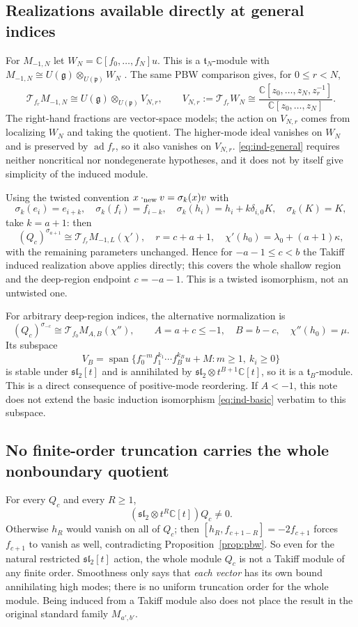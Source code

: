 \documentclass[11pt,a4paper]{article}
\theoremstyle{upright}
\newcommand{\C}{\mathbb C}
\newcommand{\g}{\mathfrak g}
\newcommand{\p}{\mathfrak p}
\newcommand{\slc}{\mathfrak{sl}_2}
\newcommand{\T}{\mathcal T}
\DeclareMathOperator{\ad}{ad}
\DeclareMathOperator{\Span}{span}
\begin{document}
\subsection{Realizations available directly at general indices}
For $M_{-1,N}$ let $W_N=\C[f_0,\ldots,f_N]u$. This is a $\mathfrak t_N$-module
with $M_{-1,N}\cong U(\g)\otimes_{U(\p)}W_N$ \cite[Lemma 2.2]{FGXZ}. The
same PBW comparison gives, for $0\le r<N$,
\begin{equation}\label{eq:ind-general}
\T_{f_r}M_{-1,N}\cong U(\g)\otimes_{U(\p)}V_{N,r},\qquad
V_{N,r}:=\T_{f_r}W_N
\cong\frac{\C[z_0,\ldots,z_N,z_r^{-1}]}{\C[z_0,\ldots,z_N]}.
\end{equation}
The right-hand fractions are vector-space models; the action on $V_{N,r}$
comes from localizing $W_N$ and taking the quotient. The higher-mode ideal
vanishes on $W_N$ and is preserved by $\ad f_r$, so it also vanishes on
$V_{N,r}$. \eqref{eq:ind-general} requires neither noncritical nor
nondegenerate hypotheses, and it does not by itself give simplicity of the
induced module.

Using the twisted convention $x\cdot_{\rm new}v=\sigma_k(x)v$ with
\[
\sigma_k(e_i)=e_{i+k},\quad \sigma_k(f_i)=f_{i-k},\quad
\sigma_k(h_i)=h_i+k\delta_{i,0}K,\quad \sigma_k(K)=K,
\]
take $k=a+1$: then
\[
(Q_c)^{\sigma_{a+1}}\cong\T_{f_r}M_{-1,L}(\chi'),\quad
r=c+a+1,\quad \chi'(h_0)=\lambda_0+(a+1)\kappa,
\]
with the remaining parameters unchanged. Hence for $-a-1\le c<b$ the Takiff
induced realization above applies directly; this covers the whole shallow
region and the deep-region endpoint $c=-a-1$. This is a twisted isomorphism,
not an untwisted one.

For arbitrary deep-region indices, the alternative normalization is
\[
(Q_c)^{\sigma_{-c}}\cong\T_{f_0}M_{A,B}(\chi''),\qquad
A=a+c\le-1,\quad B=b-c,\quad \chi''(h_0)=\mu.
\]
Its subspace
\[
V_B=\Span\{f_0^{-m}f_1^{k_1}\cdots f_B^{k_B}u+M:m\ge1,\ k_i\ge0\}
\]
is stable under $\slc[t]$ and is annihilated by
$\slc\otimes t^{B+1}\C[t]$, so it is a $\mathfrak t_B$-module. This is a
direct consequence of positive-mode reordering. If $A<-1$, this note does
not extend the basic induction isomorphism \eqref{eq:ind-basic} verbatim to
this subspace.

\subsection{No finite-order truncation carries the whole nonboundary quotient}
For every $Q_c$ and every $R\ge1$,
\begin{equation}\label{eq:no-truncation}
(\slc\otimes t^R\C[t])Q_c\ne0.
\end{equation}
Otherwise $h_R$ would vanish on all of $Q_c$; then
$[h_R,f_{c+1-R}]=-2f_{c+1}$ forces $f_{c+1}$ to vanish as well, contradicting
Proposition~\ref{prop:pbw}. So even for the natural restricted $\slc[t]$
action, the whole module $Q_c$ is not a Takiff module of any finite order.
Smoothness only says that \emph{each vector} has its own bound annihilating
high modes; there is no uniform truncation order for the whole module.
Being induced from a Takiff module also does not place the result in the
original standard family $M_{a',b'}$.
\end{document}
